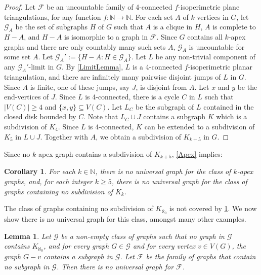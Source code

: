 \documentclass[a4paper,11pt]{article}
\theoremstyle{plain}
\newtheorem{lem}[thm]{Lemma}
\newtheorem{cor}[thm]{Corollary}
\theoremstyle{definition}
\renewcommand{\geq}{\geqslant}
\newcommand{\FF}{\mathcal{F}}
\newcommand{\GG}{\mathcal{G}}
\newcommand{\NN}{\mathbb{N}}
\begin{document}
\begin{proof} 
Let $\FF$ be an uncountable family of 4-connected $f$-isoperimetric plane triangulations, for any function $f:\NN\to\NN$. For each set $A$ of $k$ vertices in $G$, let $\GG_A$ be the set of subgraphs $H$ of $G$ such that $A$ is a clique in $H$, $A$ is complete to $H-A$, and $H-A$ is isomorphic to a graph in $\FF$. Since $G$ contains all $k$-apex graphs and there are only countably many such sets $A$, $\GG_A$ is uncountable for some set $A$.  Let $\GG_A':=\{H-A : H \in \GG_A\}$.  Let $L$ be any non-trivial component of any  $\GG_A'$-limit in $G$. By \cref{LimitLemma}, $L$ is a 4-connected $f$-isoperimetric planar triangulation, and there are infinitely many pairwise disjoint jumps of $L$ in $G$. Since $A$ is finite, one of these jumps, say $J$, is disjoint from $A$.  Let $x$ and $y$ be the end-vertices of $J$.  Since $L$ is 4-connected, there is a cycle $C$ in $L$ such that $|V(C)| \geq 4$ and $\{x,y\} \subseteq V(C)$.  Let $L_C$ be the subgraph of $L$ contained in the closed disk bounded by $C$.   Note that $L_C \cup J$ contains a subgraph $K$ which is a subdivision of $K_4$. Since $L$ is 4-connected, $K$ can be extended to a subdivision of $K_5$ in $L \cup J$. Together with $A$, we obtain a subdivision of $K_{k+5}$ in $G$.  
\end{proof}

Since no $k$-apex graph contains a subdivision of $K_{k+5}$, \cref{Apex} implies:

\begin{cor}
\label{Apex-universal}
For each $k\in\NN$, there is no universal graph for the class of $k$-apex graphs, and, for each integer $k \geq 5$, there is no universal graph for the class of graphs containing no subdivision of $K_k$.
\end{cor}

The class of graphs containing no subdivision of $K_{\aleph_0}$ is not covered by \cref{Apex-universal}. We now show there is no universal graph for this class, amongst many other examples. 

\begin{lem}
\label{Non-universal}
Let $\GG$ be a non-empty class of graphs such that no graph in $\GG$ contains $K_{\aleph_0}$, and for every graph $G \in \GG$ and for every vertex $v \in V(G)$, the graph $G-v$ contains a subgraph in $\GG$. Let $\FF$ be the family of graphs that contain no subgraph in $\GG$. Then there is no universal graph for $\FF$.
\end{lem}
\end{document}
